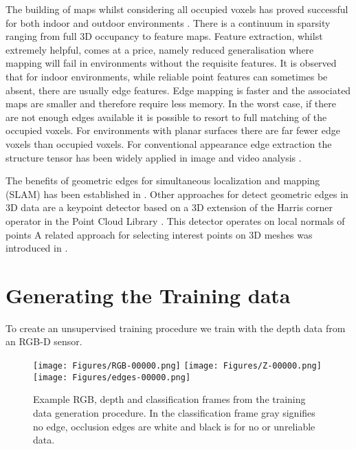 \documentclass{article} %
\begin{document}
The building of maps whilst considering all occupied voxels has proved successful for both indoor and outdoor environments \cite{ryde2011a}.  There is a continuum in sparsity ranging from full 3D occupancy to feature maps.  Feature extraction, whilst extremely helpful, comes at a price, namely reduced generalisation where mapping will fail in environments without the requisite features.  It is observed that for indoor environments, while reliable point features can sometimes be absent, there are usually edge features. Edge mapping is faster and the associated maps are smaller and therefore require less memory.
In the worst case, if there are not enough edges available it is possible to resort to full matching of the occupied voxels.  For environments with planar surfaces there are far fewer edge voxels than occupied voxels.
For conventional appearance edge extraction the structure tensor has been widely applied in image \cite{harris1988} and video analysis \cite{kuhne2001tensor, wang2003automatic}.

The benefits of geometric edges for simultaneous localization and mapping (SLAM) has been established in \cite{ryde2012extracting}.
Other approaches for detect geometric edges in 3D data are a keypoint detector based on a 3D extension of the Harris corner operator in the Point Cloud Library \cite{rusu2011_icra_PCL}. This detector operates on local normals of points
A related approach for selecting interest points on 3D meshes was introduced in \cite{sipiran2011harris}.

\section{Generating the Training data}
To create an unsupervised training procedure we train with the depth data from an RGB-D sensor.


\begin{figure*}
    \centering
    \texttt{[image: Figures/RGB-00000.png]}
    \texttt{[image: Figures/Z-00000.png]}
    \texttt{[image: Figures/edges-00000.png]}
    \caption{Example RGB, depth and classification frames from the training
        data generation procedure.  In the classification frame gray signifies
        no edge, occlusion edges are white and black is for no or unreliable
        data. }
    \label{fig_rgb_edge}
\end{figure*}
\end{document}
